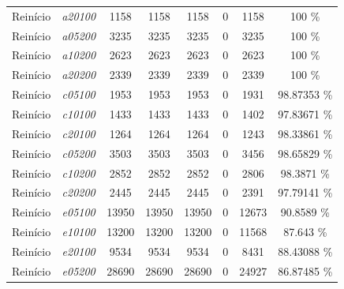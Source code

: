 \documentclass[portugues, brazil, a4paper,12pt]{article}
\begin{document}
{\begin{longtable}{cc|cccc|cc}
			Reinício           & \textit{a20100}  & 1158      & 1158           & 1158         & 0                      & 1158                            & 100 \% \\
			Reinício           & \textit{a05200}  & 3235      & 3235           & 3235         & 0                      & 3235                            & 100 \% \\
			Reinício           & \textit{a10200}  & 2623      & 2623           & 2623         & 0                      & 2623                            & 100 \% \\
			Reinício           & \textit{a20200}  & 2339      & 2339           & 2339         & 0                      & 2339                            & 100 \% \\
			Reinício           & \textit{c05100}  & 1953      & 1953           & 1953         & 0                      &  1931                           & 98.87353  \% \\
			Reinício           & \textit{c10100}  & 1433      & 1433           & 1433         & 0                      &  1402                           & 97.83671  \% \\
			Reinício           & \textit{c20100}  & 1264      & 1264           & 1264         & 0                      &  1243                           & 98.33861  \% \\
			Reinício           & \textit{c05200}  & 3503      & 3503           & 3503         & 0                      &  3456                           & 98.65829 \% \\
			Reinício           & \textit{c10200}  & 2852      & 2852           & 2852         & 0                      &  2806                           & 98.3871  \% \\
			Reinício           & \textit{c20200}  & 2445      & 2445           & 2445         & 0                      &  2391                           & 97.79141  \% \\
			Reinício           & \textit{e05100}  & 13950     & 13950          & 13950        & 0                      &   12673                         & 90.8589  \% \\
			Reinício           & \textit{e10100}  & 13200     & 13200          & 13200        & 0                      &   11568                         & 87.643  \% \\
			Reinício           & \textit{e20100}  & 9534      & 9534           & 9534         & 0                      &   8431                          & 88.43088  \% \\
			Reinício           & \textit{e05200}  & 28690     & 28690          & 28690        & 0                      &   24927                         & 86.87485  \% \\

\end{longtable}}
\end{document}
